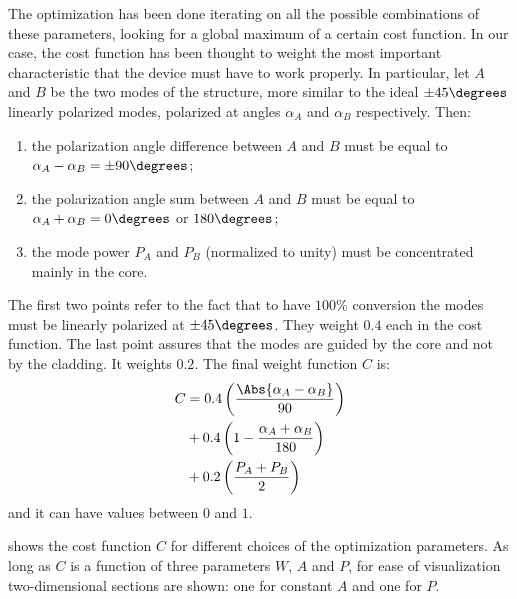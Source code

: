 The optimization has been done iterating on all the possible
combinations of these parameters, looking for a global maximum of a
certain cost function. In our case, the cost function has been thought
to weight the most important characteristic that the device must have
to work properly. In particular, let $A$ and $B$ be the two modes of
the structure, more similar to the ideal $\pm 45\degrees$ linearly
polarized modes, polarized at angles $\alpha_A$ and $\alpha_B$
respectively. Then:
\begin{enumerate}
\item
  the polarization angle difference between $A$ and $B$ must be equal
  to $\alpha_A - \alpha_B = \pm 90\degrees$;
\item
  the polarization angle sum between $A$ and $B$ must be equal
  to $\alpha_A + \alpha_B = 0\degrees$ or $180\degrees$;
\item
  the mode power $P_A$ and $P_B$ (normalized to unity) must be
  concentrated mainly in the core.
\end{enumerate}

The first two points refer to the fact that to have $100\%$ conversion
the modes must be linearly polarized at $\pm 45\degrees$. They weight
$0.4$ each in the cost function. The last point assures that the modes
are guided by the core and not by the cladding. It weights $0.2$. The
final weight function $C$ is:
\begin{equation} \label{eqn:polrot_weight} \begin{split}
  C & = 0.4 \left( \frac{\Abs{\alpha_A - \alpha_B}}{90} \right) \\
    & + 0.4 \left( 1 - \frac{\alpha_A + \alpha_B}{180} \right) \\
    & + 0.2 \left( \frac{P_A + P_B}{2} \right)
\end{split} \end{equation}
and it can have values between $0$ and $1$.

 shows the cost function $C$ for
different choices of the optimization parameters. As long as $C$ is a
function of three parameters $W$, $A$ and $P$, for ease of
visualization two-dimensional sections are shown: one for constant $A$
and one for $P$.

